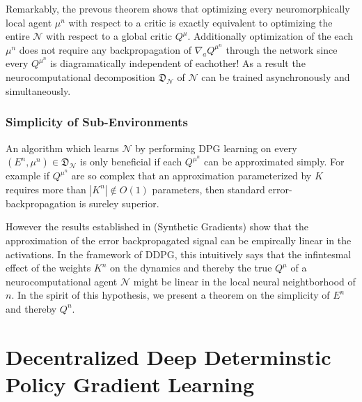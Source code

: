 \documentclass{article} %
\numberwithin{equation}{subsection}
\numberwithin{theorem}{subsection}
\theoremstyle{named}
\def\scriptn{{\mathcal N}}
\begin{document}
Remarkably, the prevous theorem shows that optimizing every neuromorphically local agent $\mu^n$ with respect 
to a critic is exactly equivalent to optimizing the entire $\scriptn$ with respect to a global critic $Q^\mu$. 
Additionally optimization of the each $\mu^n$ does not require any backpropagation of $\nabla_a Q^{\mu^n}$ through the network since every $Q^{\mu^n}$ is diagramatically independent of eachother! As a result the neurocomputational decomposition $\mathfrak{D}_\scriptn$ of $\scriptn$ can be trained asynchronously and simultaneously.

\subsubsection{Simplicity of Sub-Environments}
An algorithm which learns $\scriptn$ by performing DPG learning on every $(E^n, \mu^n) \in \mathfrak{D}_\scriptn$ is only beneficial if each $Q^{\mu^n}$ can be approximated simply. For example if $Q^{\mu^n}$ are so complex that an approximation parameterized by $K$ requires more than $|K^n| \notin O(1)$ parameters, then standard error-backpropagation is sureley superior.

However the results established in (Synthetic Gradients) show that the approximation of the error backpropagated signal can be empircally linear in the activations. In the framework of DDPG, this intuitively says that the infintesmal effect of the weights $K^n$ on the dynamics and thereby the true $Q^\mu$ of a neurocomputational agent $\scriptn$ might be linear in the local neural neightborhood of $n$. 
In the spirit of this hypothesis, we present a theorem on the simplicity of $E^n$ and thereby $Q^n$.


\section{Decentralized Deep Determinstic Policy Gradient Learning}


\end{document}
